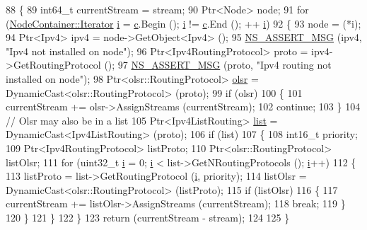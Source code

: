 \begin{DoxyCode}
88 \{
89   int64\_t currentStream = stream;
90   Ptr<Node> node;
91   \textcolor{keywordflow}{for} (\hyperlink{classns3_1_1NodeContainer_aa1a9f2d2b09bfef7d066d3974bca2cc4}{NodeContainer::Iterator} \hyperlink{bernuolliDistribution_8m_a6f6ccfcf58b31cb6412107d9d5281426}{i} = \hyperlink{lte_2model_2fading-traces_2fading__trace__generator_8m_ae0323a9039add2978bf5b49550572c7c}{c}.Begin (); \hyperlink{bernuolliDistribution_8m_a6f6ccfcf58b31cb6412107d9d5281426}{i} != \hyperlink{lte_2model_2fading-traces_2fading__trace__generator_8m_ae0323a9039add2978bf5b49550572c7c}{c}.End (); ++
      \hyperlink{bernuolliDistribution_8m_a6f6ccfcf58b31cb6412107d9d5281426}{i})
92     \{
93       node = (*i);
94       Ptr<Ipv4> ipv4 = node->GetObject<Ipv4> ();
95       \hyperlink{assert_8h_aff5ece9066c74e681e74999856f08539}{NS\_ASSERT\_MSG} (ipv4, \textcolor{stringliteral}{"Ipv4 not installed on node"});
96       Ptr<Ipv4RoutingProtocol> proto = ipv4->GetRoutingProtocol ();
97       \hyperlink{assert_8h_aff5ece9066c74e681e74999856f08539}{NS\_ASSERT\_MSG} (proto, \textcolor{stringliteral}{"Ipv4 routing not installed on node"});
98       Ptr<olsr::RoutingProtocol> \hyperlink{namespaceolsr}{olsr} = DynamicCast<olsr::RoutingProtocol> (proto);
99       \textcolor{keywordflow}{if} (olsr)
100         \{
101           currentStream += olsr->AssignStreams (currentStream);
102           \textcolor{keywordflow}{continue};
103         \}
104       \textcolor{comment}{// Olsr may also be in a list}
105       Ptr<Ipv4ListRouting> \hyperlink{openflow-interface_8h_afd9bcfa176617760671b67580f536fa7}{list} = DynamicCast<Ipv4ListRouting> (proto);
106       \textcolor{keywordflow}{if} (list)
107         \{
108           int16\_t priority;
109           Ptr<Ipv4RoutingProtocol> listProto;
110           Ptr<olsr::RoutingProtocol> listOlsr;
111           \textcolor{keywordflow}{for} (uint32\_t \hyperlink{bernuolliDistribution_8m_a6f6ccfcf58b31cb6412107d9d5281426}{i} = 0; \hyperlink{bernuolliDistribution_8m_a6f6ccfcf58b31cb6412107d9d5281426}{i} < list->GetNRoutingProtocols (); \hyperlink{bernuolliDistribution_8m_a6f6ccfcf58b31cb6412107d9d5281426}{i}++)
112             \{
113               listProto = list->GetRoutingProtocol (\hyperlink{bernuolliDistribution_8m_a6f6ccfcf58b31cb6412107d9d5281426}{i}, priority);
114               listOlsr = DynamicCast<olsr::RoutingProtocol> (listProto);
115               \textcolor{keywordflow}{if} (listOlsr)
116                 \{
117                   currentStream += listOlsr->AssignStreams (currentStream);
118                   \textcolor{keywordflow}{break};
119                 \}
120             \}
121         \}
122     \}
123   \textcolor{keywordflow}{return} (currentStream - stream);
124 
125 \}
\end{DoxyCode}


